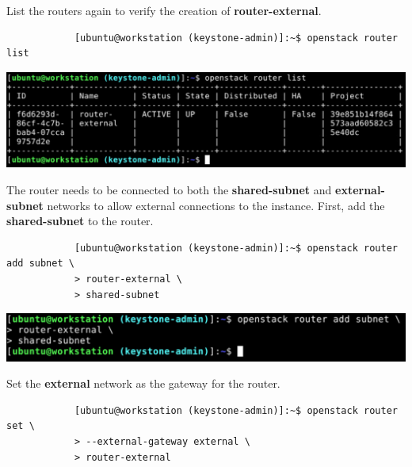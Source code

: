 \documentclass[letterpaper, 12pt]{article}
\begin{document}
\begin{enumerate}
    \begin{labstep}
        List the routers again to verify the creation of \textbf{router-external}.
        \begin{lstlisting}
            [ubuntu@workstation (keystone-admin)]:~$ openstack router list
        \end{lstlisting}

        \begin{center}
            \includegraphics[width=\linewidth]{images/part5/step15.png}
        \end{center}
    \end{labstep}

    \begin{labstep}
        The router needs to be connected to both the \textbf{shared-subnet} and \textbf{external-subnet} networks to allow external connections to the instance.
        First, add the \textbf{shared-subnet} to the router.
        \begin{lstlisting}
            [ubuntu@workstation (keystone-admin)]:~$ openstack router add subnet \
            > router-external \
            > shared-subnet
        \end{lstlisting}

        \begin{center}
            \includegraphics[width=\linewidth]{images/part5/step16.png}
        \end{center}
    \end{labstep}

    \begin{labstep}
        Set the \textbf{external} network as the gateway for the router.
        \begin{lstlisting}
            [ubuntu@workstation (keystone-admin)]:~$ openstack router set \
            > --external-gateway external \
            > router-external
        \end{lstlisting}


\end{labstep}
\end{enumerate}
\end{document}

